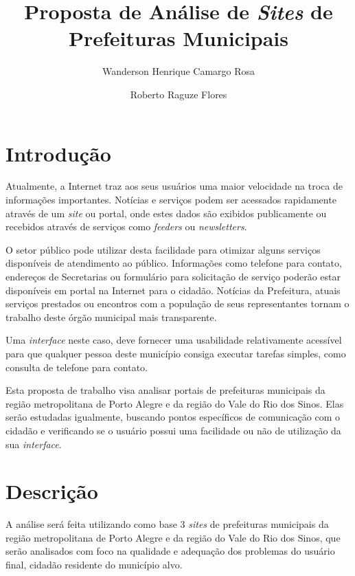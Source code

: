 \documentclass{article}
\title{Proposta de Análise de \textit{Sites} de Prefeituras Municipais}
\author{Wanderson Henrique Camargo Rosa\inst{1}\and{}Roberto Raguze
Flores\inst{1}}
\begin{document}
\maketitle{}

\section{Introdução}

Atualmente, a Internet traz aos seus usuários uma maior velocidade na troca de
informações importantes. Notícias e serviços podem ser acessados rapidamente
através de um \textit{site} ou portal, onde estes dados são exibidos
publicamente ou recebidos através de serviços como \textit{feeders} ou
\textit{newsletters}.

O setor público pode utilizar desta facilidade para otimizar alguns serviços
disponíveis de atendimento ao público. Informações como telefone para contato,
endereços de Secretarias ou formulário para solicitação de serviço poderão estar
disponíveis em portal na Internet para o cidadão. Notícias da Prefeitura, atuais
serviços prestados ou encontros com a população de seus representantes tornam o
trabalho deste órgão municipal mais transparente.

Uma \textit{interface} neste caso, deve fornecer uma usabilidade relativamente
acessível para que qualquer pessoa deste município consiga executar tarefas
simples, como consulta de telefone para contato.

Esta proposta de trabalho visa analisar portais de prefeituras municipais da
região metropolitana de Porto Alegre e da região do Vale do Rio dos Sinos. Elas
serão estudadas igualmente, buscando pontos específicos de comunicação com o
cidadão e verificando se o usuário possui uma facilidade ou não de utilização da
sua \textit{interface}.

\section{Descrição}

A análise será feita utilizando como base 3 \textit{sites} de prefeituras
municipais da região metropolitana de Porto Alegre e da região do Vale do Rio
dos Sinos, que serão analisados com foco na qualidade e adequação dos problemas
do usuário final, cidadão residente do município alvo.
\end{document}
